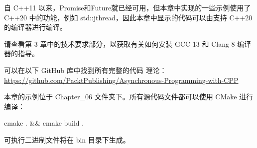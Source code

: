 

自 C++11 以来，Promise和Future就已经可用，但本章中实现的一些示例使用了 C++20 中的功能，例如 std::jthread，因此本章中显示的代码可以由支持 C++20 的编译器进行编译。

请查看第 3 章中的技术要求部分，以获取有关如何安装 GCC 13 和 Clang 8 编译器的指导。

可以在以下 GitHub 库中找到所有完整的代码 理论： \url{https://github.com/PacktPublishing/Asynchronous-Programming-with-CPP}

本章的示例位于 Chapter\_06 文件夹下。所有源代码文件都可以使用 CMake 进行编译：

\begin{shell}
cmake . && cmake build .
\end{shell}

可执行二进制文件将在 bin 目录下生成。

